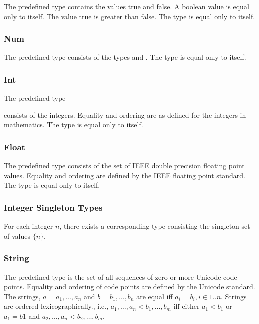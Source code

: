 \documentclass{article}
\begin{document}
{The predefined type \BOOL{} contains the values true and false.  A boolean value is equal only to itself. The value true is greater than false. The type \BOOL{} is equal only to itself.

\subsubsection{Num}
\label{number}

 The predefined type \NUM{} consists of the types \INT{} and \FLOAT. The type \NUM{} is equal only to itself. 
 
\subsubsection{Int}
\label{int}

The predefined type \INT} consists of the integers. Equality and ordering are as defined for the integers in mathematics. The type \INT{} is equal only to itself.


\subsubsection{Float}
\label{float}

The predefined type \FLOAT{} consists of the set of IEEE double precision floating point values.  Equality and ordering are defined by the IEEE floating point standard.  The type \FLOAT{} is equal only to itself.
 
\subsubsection{Integer Singleton Types}
\label{integerSingletonTypes}

For each integer $n$, there exists a corresponding type consisting the singleton set of values $\{n\}$. 


\subsubsection{String}
\label{string}

The predefined type \STRING{} is the set of all sequences of zero or more Unicode code points. Equality and ordering of code points are defined by the Unicode standard. 
The strings, $a = a_1, \ldots, a_n$ and $b = b_1, \ldots, b_n$ are equal iff $a_i = b_i, i \in 1..n$. Strings are ordered lexicographically., i.e., $a_1, \ldots, a_n < b_1, \ldots, b_m$ iff  either $a_1 < b_1$ or $a_1 = b1$ and $a_2, \ldots, a_n < b_2, \ldots, b_m$.
\end{document}

